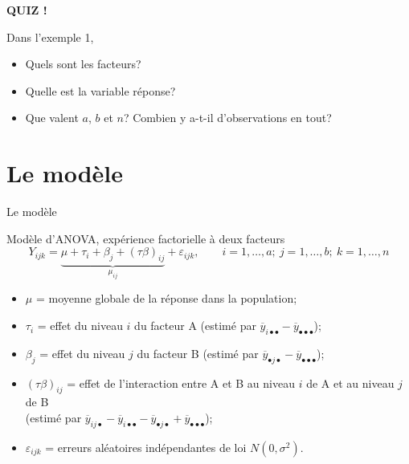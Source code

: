 \documentclass{BeamerTemplate}
\begin{document}
\begin{frame}[plain,t]
  \centerline{\LARGE\bfseries\alert{QUIZ !}}

  \medskip
  Dans l'exemple 1,
  \begin{itemize}\itemsep 1.2cm
    \item Quels sont les facteurs?
    \item Quelle est la variable réponse?
    \item Que valent $a$, $b$ et $n$? Combien y a-t-il d'observations en tout?
  \end{itemize}
\end{frame}

\section{Le modèle}

\begin{frame}[t]{Le modèle}

\begin{Boite}{{Modèle d'ANOVA, expérience factorielle à deux facteurs}}
\[
Y_{ijk}=\underbrace{\mu+\tau_i+\beta_j+(\tau\beta)_{ij}}_{\mu_{ij}}+\varepsilon_{ijk},
\qquad i=1,\ldots,a;\ j=1,\ldots,b;\ k=1,\ldots,n
\]
\end{Boite}

\small
\begin{itemize}\itemsep0mm
  \item $\mu$ = moyenne globale de la réponse dans la population;
  \item<2-> $\tau_i$ = effet du niveau $i$ du facteur A
  (estimé par $\overline{y}_{i\bullet\bullet}-\overline{y}_{\bullet\bullet\bullet}$);
  \item<3-> $\beta_j$ = effet du niveau $j$ du facteur B
  (estimé par $\overline{y}_{\bullet j\bullet}-\overline{y}_{\bullet\bullet\bullet}$);
  \item<4-> $(\tau\beta)_{ij}$ = effet de l'\alert{interaction} entre A et B au niveau
  $i$ de A et au niveau $j$ de B\\
  (estimé par $\overline{y}_{ij\bullet}-\overline{y}_{i\bullet\bullet}
  -\overline{y}_{\bullet j\bullet}+\overline{y}_{\bullet\bullet\bullet}$);
  \item<5-> $\varepsilon_{ijk}$ = erreurs aléatoires indépendantes de loi $N(0,\sigma^2)$.
\end{itemize}

\end{frame}
\end{document}
